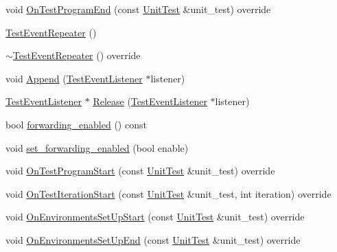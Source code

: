 \begin{DoxyCompactItemize}
\item 
void \mbox{\hyperlink{classtesting_1_1internal_1_1_test_event_repeater_a255378258ea0d14688303d4a6421746f}{On\+Test\+Program\+End}} (const \mbox{\hyperlink{classtesting_1_1_unit_test}{Unit\+Test}} \&unit\+\_\+test) override
\item 
\mbox{\hyperlink{classtesting_1_1internal_1_1_test_event_repeater_a97dc3b08bd62c615f16e4c73ed0b3894}{Test\+Event\+Repeater}} ()
\item 
\mbox{\hyperlink{classtesting_1_1internal_1_1_test_event_repeater_a8cf2d21be2b131177b5926b9e04f0f98}{$\sim$\+Test\+Event\+Repeater}} () override
\item 
void \mbox{\hyperlink{classtesting_1_1internal_1_1_test_event_repeater_ad154ce021881721a5c46994316b14cb1}{Append}} (\mbox{\hyperlink{classtesting_1_1_test_event_listener}{Test\+Event\+Listener}} $\ast$listener)
\item 
\mbox{\hyperlink{classtesting_1_1_test_event_listener}{Test\+Event\+Listener}} $\ast$ \mbox{\hyperlink{classtesting_1_1internal_1_1_test_event_repeater_a6aae8ac4eb3d9aa655f2ba71673dfd06}{Release}} (\mbox{\hyperlink{classtesting_1_1_test_event_listener}{Test\+Event\+Listener}} $\ast$listener)
\item 
bool \mbox{\hyperlink{classtesting_1_1internal_1_1_test_event_repeater_abaf2bfc453fc0e1005fcfb0f95deac4c}{forwarding\+\_\+enabled}} () const
\item 
void \mbox{\hyperlink{classtesting_1_1internal_1_1_test_event_repeater_a86c52e311b70598a385a0589277e92e0}{set\+\_\+forwarding\+\_\+enabled}} (bool enable)
\item 
void \mbox{\hyperlink{classtesting_1_1internal_1_1_test_event_repeater_abe19a6eed2548e9c768ae2d156f1f593}{On\+Test\+Program\+Start}} (const \mbox{\hyperlink{classtesting_1_1_unit_test}{Unit\+Test}} \&unit\+\_\+test) override
\item 
void \mbox{\hyperlink{classtesting_1_1internal_1_1_test_event_repeater_a98fea6c94833db424e083eff337ef370}{On\+Test\+Iteration\+Start}} (const \mbox{\hyperlink{classtesting_1_1_unit_test}{Unit\+Test}} \&unit\+\_\+test, int iteration) override
\item 
void \mbox{\hyperlink{classtesting_1_1internal_1_1_test_event_repeater_a739b5fd1f5bcb96b42089ff06281b3ea}{On\+Environments\+Set\+Up\+Start}} (const \mbox{\hyperlink{classtesting_1_1_unit_test}{Unit\+Test}} \&unit\+\_\+test) override
\item 
void \mbox{\hyperlink{classtesting_1_1internal_1_1_test_event_repeater_a744eeb6ddfcba78b34515fac7f1ab704}{On\+Environments\+Set\+Up\+End}} (const \mbox{\hyperlink{classtesting_1_1_unit_test}{Unit\+Test}} \&unit\+\_\+test) override

\end{DoxyCompactItemize}
